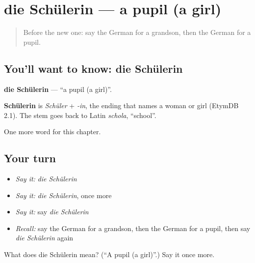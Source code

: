 \section[die Schülerin]{die Schülerin — a pupil (a girl)}

\label{lesson:GE-C63-schuelerin}



\begin{quote}
Before the new one: say the German for a grandson, then the German for a pupil.
\end{quote}

\subsection*{You'll want to know: die Schülerin}
\textbf{die Schülerin} — \textquotedblleft{}a pupil (a girl)\textquotedblright{}.

\begin{cousinweb}
\textbf{Schülerin} is \emph{Schüler} + \emph{-in}, the ending that names a woman or girl (EtymDB 2.1). The stem goes back to Latin \emph{schola}, \textquotedblleft{}school\textquotedblright{}.
\end{cousinweb}

\begin{grammarlens}[title={What you've built}]
One more word for this chapter.
\end{grammarlens}

\subsection*{Your turn}
\begin{itemize}
\raggedright
  \item \emph{Say it:} \emph{die Schülerin}
  \item \emph{Say it:} \emph{die Schülerin}, once more
  \item \emph{Say it:} say \emph{die Schülerin}
  \item \emph{Recall:} say the German for a grandson, then the German for a pupil, then say \emph{die Schülerin} again
\end{itemize}

\begin{tcolorbox}[breakable,colback=teal!4,colframe=teal!35!black,title={Before you move on}]
What does die Schülerin mean? (\textquotedblleft{}A pupil (a girl)\textquotedblright{}.) Say it once more.
\end{tcolorbox}
